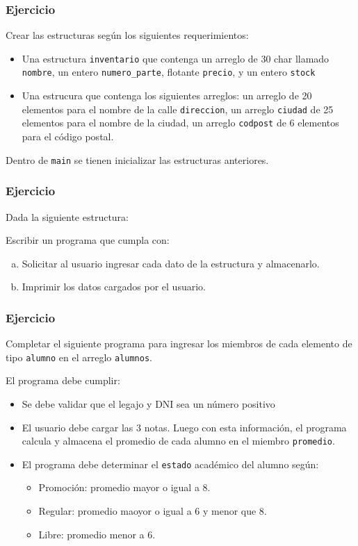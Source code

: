 \subsubsection{Ejercicio}
Crear las estructuras según los siguientes requerimientos:
\begin{itemize}
  \item Una estructura \texttt{inventario} que contenga un arreglo de 30 char llamado \texttt{nombre}, un entero \texttt{numero\_parte}, flotante \texttt{precio}, y un entero \texttt{stock}
  \item  Una estrucura que contenga los siguientes arreglos: un arreglo de 20 elementos para el nombre de la calle \texttt{direccion}, un arreglo \texttt{ciudad} de 25 elementos para el nombre de la ciudad, un arreglo \texttt{codpost} de 6 elementos para el código postal.
\end{itemize}
Dentro de \texttt{main} se tienen inicializar las estructuras anteriores.

\subsubsection{Ejercicio}
Dada la siguiente estructura:
\lstset{inputencoding=utf8/latin1}

Escribir un programa que cumpla con:
\begin{enumerate}[a)]
  \item Solicitar al usuario ingresar cada dato de la estructura y almacenarlo.
  \item Imprimir los datos cargados por el usuario.
\end{enumerate}

\subsubsection{Ejercicio}
 Completar el siguiente programa para ingresar los miembros de cada elemento de tipo \texttt{alumno} en el arreglo \texttt{alumnos}.
\lstset{inputencoding=utf8/latin1}

El programa debe cumplir:
\begin{itemize}
  \item Se debe validar que el legajo y DNI sea un número positivo
  \item El usuario debe cargar las 3 notas. Luego con esta información, el programa calcula y almacena el promedio de cada alumno en el miembro \texttt{promedio}.
  \item El programa debe determinar el \texttt{estado} académico del alumno según:
    \begin{itemize}
      \item Promoción: promedio mayor o igual a 8.
      \item Regular: promedio maoyor o igual a 6 y menor que 8.
      \item Libre: promedio menor a 6.
    \end{itemize}
\end{itemize}

